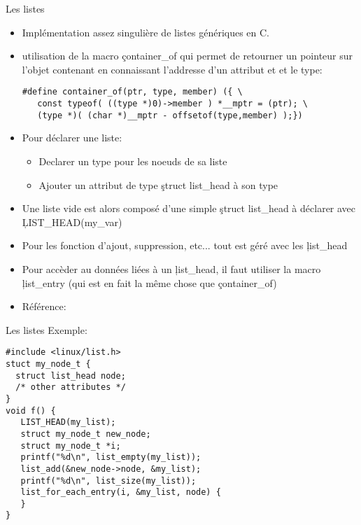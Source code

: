 \begin{frame}[fragile=singleslide]{Les listes}
  \begin{itemize} 
  \item Implémentation assez singulière de listes génériques en C. 
  \item  utilisation  de  la  macro  \c{container_of}  qui  permet  de
    retourner  un  pointeur   sur  l'objet  contenant  en  connaissant
    l'addresse d'un attribut et et le type:
    \begin{lstlisting} 
#define container_of(ptr, type, member) ({ \ 
   const typeof( ((type *)0)->member ) *__mptr = (ptr); \
   (type *)( (char *)__mptr - offsetof(type,member) );})
    \end{lstlisting} 
  \item Pour déclarer une liste: 
    \begin{itemize}
    \item Declarer un type pour les noeuds de sa liste
    \item Ajouter un attribut de type \c{struct list_head} à son type
    \end{itemize} 
  \item   Une   liste   vide    est   alors   composé   d'une   simple
    \c{struct list_head} à déclarer avec \c{LIST_HEAD(my_var)}
  \item Pour  les fonction d'ajout, suppression, etc...  tout est géré
    avec les \c{list_head}
  \item  Pour accèder  au données  liées à  un \c{list_head},  il faut
    utiliser la  macro \c{list_entry} (qui  est en fait la  même chose
    que \c{container_of})
  \item Référence: \file{linux/list.h}
  \end{itemize}  
\end{frame}

\begin{frame}[fragile=singleslide]{Les listes}
  Exemple: 
    \begin{lstlisting}
#include <linux/list.h>
stuct my_node_t {
  struct list_head node;
  /* other attributes */
}
void f() {
   LIST_HEAD(my_list);
   struct my_node_t new_node; 
   struct my_node_t *i; 
   printf("%d\n", list_empty(my_list));
   list_add(&new_node->node, &my_list);
   printf("%d\n", list_size(my_list));
   list_for_each_entry(i, &my_list, node) {
   }
} 
    \end{lstlisting} 
\end{frame} 

